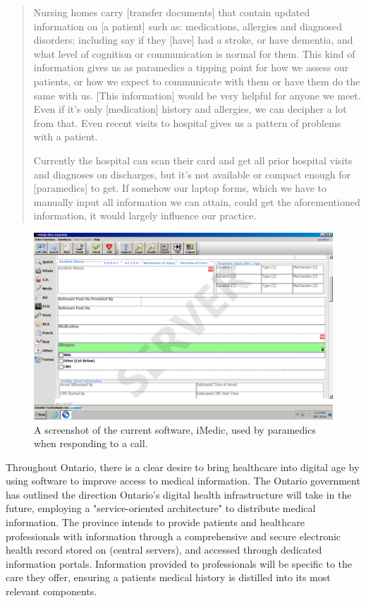 \blockquote{Nursing homes carry [transfer documents] that contain updated information on [a patient] such as: medications, allergies and diagnosed disorders; including say if they [have] had a stroke, or have dementia, and what level of cognition or communication is normal for them. This kind of information gives us as paramedics a tipping point for how we assess our patients, or how we expect to communicate with them or have them do the same with us. [This information] would be very helpful for anyone we meet. Even if it's only [medication] history and allergies, we can decipher a lot from that. Even recent visits to hospital gives us a pattern of problems with a patient.

Currently the hospital can scan their card and get all prior hospital visits and diagnoses on discharges, but it's not available or compact enough for [paramedics] to get. If somehow our laptop forms, which we have to manually input all information we can attain, could get the aforementioned information, it would largely influence our practice.
}



\begin{figure}[h]
  \centering
  \includegraphics[width=\linewidth]{iMedic.png}
  \captionsetup{format=hang}
  \caption[Screenshot of iMedic Software]{A screenshot of the current software, iMedic, used by paramedics when responding to a call.}
  \label{fig:eHealth1}
\end{figure}


\iffalse

Throughout Ontario, there is a clear desire to bring healthcare into digital age by using software to improve access to medical information. The Ontario government has outlined the direction Ontario's digital health infrastructure will take in the future, employing a "service-oriented architecture" to distribute medical information.  The province intends to provide patients and healthcare professionals with information through a comprehensive and secure electronic health record stored on (central servers), and accessed through dedicated information portals. Information provided to professionals will be specific to the care they offer, ensuring a patients medical history is distilled into its most relevant components.


